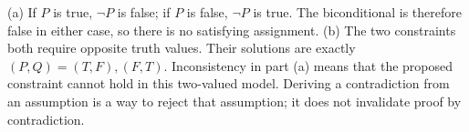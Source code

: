(a) If $P$ is true, $\neg P$ is false; if $P$ is false, $\neg P$ is true. The biconditional is therefore false in either case, so there is no satisfying assignment.
(b) The two constraints both require opposite truth values. Their solutions are exactly $\boxed{(P,Q)=(T,F),(F,T)}$.
Inconsistency in part (a) means that the proposed constraint cannot hold in this two-valued model. Deriving a contradiction from an assumption is a way to reject that assumption; it does not invalidate proof by contradiction.
